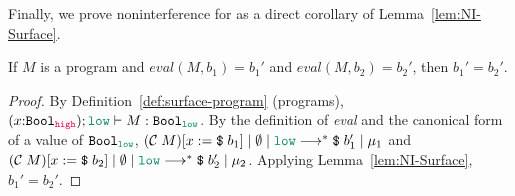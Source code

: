 Finally, we prove noninterference for \Surface as a direct corollary of
Lemma~\ref{lem:NI-Surface}.

\begin{theorem}
  \label{thm:NI-Surface}
  If $M$ is a \Surface program and $\mathit{eval}(M,b_1)=b_1'$ and $\mathit{eval}(M,b_2)=b_2'$,
  then $b_1' = b_2'$.
\end{theorem}
\begin{proof}
  By Definition~\ref{def:surface-program} (\Surface programs),
  $(x{:}\Bool_{\high}) ; \low \vdash M : \Bool_{\low}$. By the definition of
  \textit{eval} and the canonical form of a value of $\Bool_{\low}$,
  $\reducemult{(\compile{M}) [ x := \ccconst{b_1}]}{\emptyset}{\low}{\ccconst{b_1'}}{\mu_1}$ and
  $\reducemult{(\compile{M}) [ x := \ccconst{b_2}]}{\emptyset}{\low}{\ccconst{b_2'}}{\mu_2}$.
  Applying Lemma~\ref{lem:NI-Surface}, $b_1'=b_2'$.
\end{proof}
